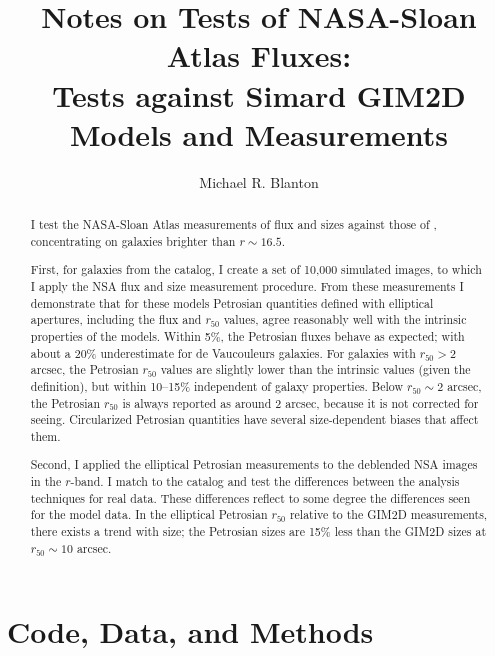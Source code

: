 \documentclass[10pt,preprint]{aastex}
\newcounter{thefigs}
\newcounter{address}
\begin{document}
\title{Notes on Tests of NASA-Sloan Atlas Fluxes:\\
Tests against Simard GIM2D Models and Measurements}


\author{
Michael R. Blanton\altaffilmark{\ref{NYU}}
}

\setcounter{address}{1}

\begin{abstract}
I test the NASA-Sloan Atlas measurements of flux and sizes against
those of \citet{simard11a}, concentrating on galaxies brighter than
$r\sim16.5$. 

First, for galaxies from the \citet{simard11a} catalog, I create a set
of 10,000 simulated images, to which I apply the NSA flux and size
measurement procedure. From these measurements I demonstrate that for
these models Petrosian quantities defined with elliptical apertures,
including the flux and $r_{50}$ values, agree reasonably well with the
intrinsic properties of the models. Within 5\%, the Petrosian fluxes
behave as expected; with about a 20\% underestimate for de Vaucouleurs
galaxies. For galaxies with $r_{50}>2$ arcsec, the Petrosian $r_{50}$
values are slightly lower than the intrinsic values (given the
\citet{simard11a} definition), but within 10--15\% independent of
galaxy properties. Below $r_{50} \sim 2$ arcsec, the Petrosian
$r_{50}$ is always reported as around 2 arcsec, because it is not
corrected for seeing. Circularized Petrosian quantities have several
size-dependent biases that affect them.

Second, I applied the elliptical Petrosian measurements to the
deblended NSA images in the $r$-band.  I match to the
\citet{simard11a} catalog and test the differences between the
analysis techniques for real data. These differences reflect to some
degree the differences seen for the model data. In the elliptical
Petrosian $r_{50}$ relative to the GIM2D measurements, there exists a
trend with size; the Petrosian sizes are 15\% less than the GIM2D
sizes at $r_{50}\sim 10$ arcsec.
\end{abstract}

\setcounter{thefigs}{0}

\section{Code, Data, and Methods} 
\label{sec:code}
\end{document}
